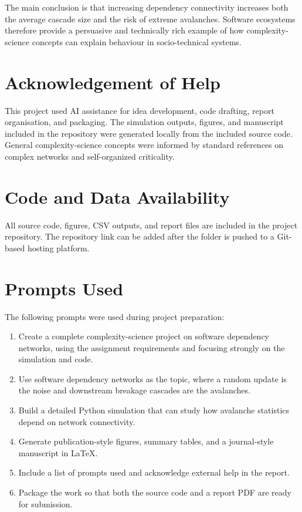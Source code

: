 \documentclass[11pt]{article}
\begin{document}
The main conclusion is that increasing dependency connectivity increases both the average cascade size and the risk of extreme avalanches. Software ecosystems therefore provide a persuasive and technically rich example of how complexity-science concepts can explain behaviour in socio-technical systems.

\section*{Acknowledgement of Help}
This project used AI assistance for idea development, code drafting, report organisation, and packaging. The simulation outputs, figures, and manuscript included in the repository were generated locally from the included source code. General complexity-science concepts were informed by standard references on complex networks and self-organized criticality.

\section*{Code and Data Availability}
All source code, figures, CSV outputs, and report files are included in the project repository. The repository link can be added after the folder is pushed to a Git-based hosting platform.

\appendix
\section{Prompts Used}
The following prompts were used during project preparation:

\begin{enumerate}[leftmargin=1.4em]
\item Create a complete complexity-science project on software dependency networks, using the assignment requirements and focusing strongly on the simulation and code.
\item Use software dependency networks as the topic, where a random update is the noise and downstream breakage cascades are the avalanches.
\item Build a detailed Python simulation that can study how avalanche statistics depend on network connectivity.
\item Generate publication-style figures, summary tables, and a journal-style manuscript in LaTeX.
\item Include a list of prompts used and acknowledge external help in the report.
\item Package the work so that both the source code and a report PDF are ready for submission.
\end{enumerate}



\end{document}

